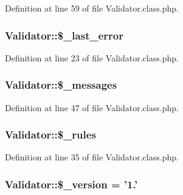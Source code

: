 Definition at line 59 of file Validator.\-class.\-php.

\hypertarget{classValidator_a1b957a11848d8cb550fc578052f49588}{
\subsubsection[{\$\-\_\-last\-\_\-error}]{\setlength{\rightskip}{0pt plus 5cm}Validator\-::\$\-\_\-last\-\_\-error}}\label{classValidator_a1b957a11848d8cb550fc578052f49588}


Definition at line 23 of file Validator.\-class.\-php.

\hypertarget{classValidator_ac9f1f384dc723b2a4581e83066fba49c}{
\subsubsection[{\$\-\_\-messages}]{\setlength{\rightskip}{0pt plus 5cm}Validator\-::\$\-\_\-messages}}\label{classValidator_ac9f1f384dc723b2a4581e83066fba49c}


Definition at line 47 of file Validator.\-class.\-php.

\hypertarget{classValidator_ab0ec00f502a96e6c95d963fe8cf40c00}{
\subsubsection[{\$\-\_\-rules}]{\setlength{\rightskip}{0pt plus 5cm}Validator\-::\$\-\_\-rules}}\label{classValidator_ab0ec00f502a96e6c95d963fe8cf40c00}


Definition at line 35 of file Validator.\-class.\-php.

\hypertarget{classValidator_af3e80f6437543d50f58f1e5269900068}{
\subsubsection[{\$\-\_\-version}]{\setlength{\rightskip}{0pt plus 5cm}Validator\-::\$\-\_\-version = '1.'}}\label{classValidator_af3e80f6437543d50f58f1e5269900068}



